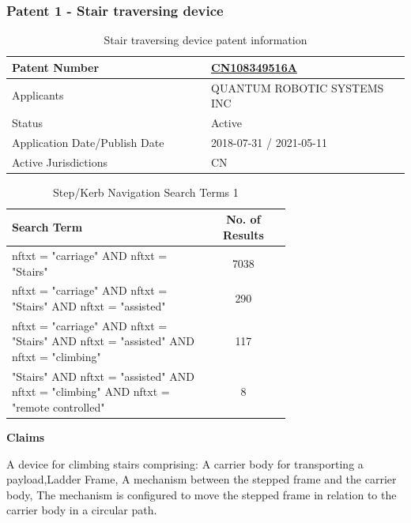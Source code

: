 \documentclass [12pt]{article}
\begin{document}
\subsubsection{Patent 1 - Stair traversing device}

\begin{table}[H]
    \centering
    \setlength{\arrayrulewidth}{1.5pt}
    \begin{tabular}{|p{0.5\linewidth}|p{0.5\linewidth}|}
    \hline
    Patent Number & \href{https://worldwide.espacenet.com/patent/search/family/058762787/publication/CN108349516A?q=CN108349516A}{CN108349516A}\\
    \hline
    Applicants & QUANTUM ROBOTIC SYSTEMS INC\\
    \hline
    Status & Active\\
    \hline
    Application Date/Publish Date & 2018-07-31 / 2021-05-11\\
    \hline
    Active Jurisdictions & CN\\
    \hline
    \end{tabular}
    \caption{Stair traversing device patent information}
    \label{table:stair_traversing_device_patent_information}
\end{table}

\begin{table}[H]
    \centering
    \setlength{\arrayrulewidth}{1.5pt}
    \begin{tabular}{|p{0.7\linewidth}|c|}
    \hline
    \cellcolor{gray!40}Search Term & \cellcolor{gray!40}No. of Results \\
    \hline
    nftxt = "carriage" AND nftxt = "Stairs" & 7038 \\
    \hline
    nftxt = "carriage" AND nftxt = "Stairs" AND nftxt = "assisted" & 290 \\
    \hline
    nftxt = "carriage" AND nftxt = "Stairs" AND nftxt = "assisted" AND nftxt = "climbing" & 117 \\
    \hline
    "Stairs" AND nftxt = "assisted" AND nftxt = "climbing" AND nftxt = "remote controlled" & 8 \\
    \hline
    \end{tabular}
    \caption{Step/Kerb Navigation Search Terms 1}
    \label{table:step_Kerb_nav_st_1}
\end{table}

\textbf{Claims}

A device for climbing stairs comprising: A carrier body for transporting a payload,Ladder Frame, A mechanism between the stepped frame and the carrier body, The mechanism is configured to move the stepped frame in relation to the carrier body in a circular path.
\end{document}

